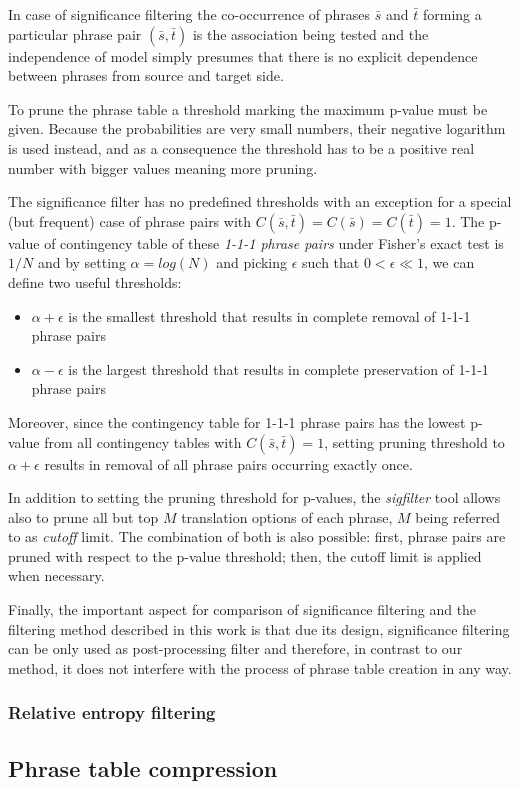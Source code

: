 In case of significance filtering the co-occurrence of phrases $\bar{s}$ and $\bar{t}$
forming a particular phrase pair $(\bar{s},\bar{t})$ is the association being tested
and the independence of model simply presumes that there is no explicit dependence
between phrases from source and target side.

To prune the phrase table a threshold marking the maximum p-value must be given.
Because the probabilities are very small numbers, their negative logarithm is used
instead, and as a consequence the threshold has to be a positive real number with
bigger values meaning more pruning.

The significance filter has no predefined thresholds with an exception for a special
(but frequent) case of phrase pairs with $C(\bar{s},\bar{t}) = C(\bar{s}) = C(\bar{t}) = 1$.
The p-value of contingency table of these \emph{1-1-1 phrase pairs} under Fisher's
exact test is $1/N$ and by setting $\alpha = log(N)$ and picking $\epsilon$ such that
$0 < \epsilon \ll 1$, we can define two useful thresholds:
\begin{itemize}
  \item $\alpha + \epsilon$ is the smallest threshold that results in complete removal
    of 1-1-1 phrase pairs
  \item $\alpha - \epsilon$ is the largest threshold that results in complete preservation
    of 1-1-1 phrase pairs
\end{itemize}

Moreover, since the contingency table for 1-1-1 phrase pairs has the lowest p-value
from all contingency tables with $C(\bar{s},\bar{t}) = 1$, setting pruning threshold
to $\alpha + \epsilon$ results in removal of all phrase pairs occurring exactly once.

In addition to setting the pruning threshold for p-values, the \emph{sigfilter} tool
allows also to prune all but top $M$ translation options of each phrase, $M$ being
referred to as \emph{cutoff} limit.
The combination of both is also possible: first, phrase pairs are pruned with
respect to the p-value threshold; then, the cutoff limit is applied when necessary.

Finally, the important aspect for comparison of significance filtering and the
filtering method described in this work is that due its design, significance
filtering can be only used as post-processing filter and therefore, in contrast to
our method, it does not interfere with the process of phrase table creation in any way.

\subsubsection*{Relative entropy filtering}

\subsection{Phrase table compression}
